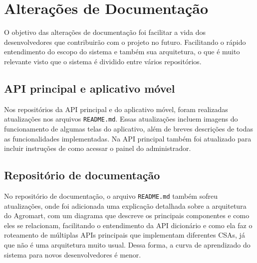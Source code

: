 \chapter{Alterações de Documentação}
O objetivo das alterações de documentação foi facilitar a vida dos desenvolvedores que contribuirão com o projeto no futuro. Facilitando o rápido entendimento do escopo do sistema e também sua arquitetura, o que é muito relevante visto que o sistema é dividido entre vários repositórios.

\section{API principal e aplicativo móvel}
Nos repositórios da API principal e do aplicativo móvel, foram realizadas atualizações nos arquivos \texttt{README.md}. Essas atualizações incluem imagens do funcionamento de algumas telas do aplicativo, além de breves descrições de todas as funcionalidades implementadas. Na API principal também foi atualizado para incluir instruções de como acessar o painel do administrador. 

\section{Repositório de documentação}
No repositório de documentação, o arquivo \texttt{README.md} também sofreu atualizações, onde foi adicionada uma explicação detalhada sobre a arquitetura do Agromart, com um diagrama que descreve os principais componentes e como eles se relacionam, facilitando o entendimento da API dicionário e como ela faz o roteamento de múltiplas APIs principais que implementam diferentes CSAs, já que não é uma arquitetura muito usual. Dessa forma, a curva de aprendizado do sistema para novos desenvolvedores é menor.

